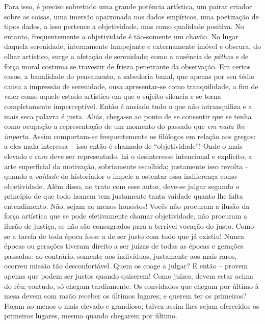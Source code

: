 Para isso, é preciso sobretudo uma grande potência artística, um pairar
criador sobre as coisas, uma imersão apaixonada nos dados empíricos, uma
poetização de tipos dados, a isso pertence a objetividade, mas como
qualidade positiva. No entanto, frequentemente a objetividade é
tão-somente um chavão. No lugar daquela serenidade, internamente
lampejante e externamente imóvel e obscura, do olhar artístico, surge a
afetação de serenidade; como a ausência de \emph{páthos} e de força
moral costuma se travestir de frieza penetrante da observação. Em certos
casos, a banalidade do pensamento, a sabedoria banal, que apenas por seu
tédio causa a impressão de serenidade, ousa apresentar-se como
tranquilidade, a fim de valer como aquele estado artístico em que o
sujeito silencia e se torna completamente imperceptível. Então é ansiado
tudo o que não intranquiliza e a mais seca palavra é justa. Aliás,
chega-se ao ponto de se consentir que se tenha como ocupação a
representação de um momento do passado que \emph{em nada lhe importa}.
Assim comportam-se frequentemente os filólogos em relação aos gregos: a
eles nada interessa -- isso então é chamado de ``objetividade''! Onde o
mais elevado e raro deve ser representado, há o desinteresse intencional
e explícito, a arte superficial da motivação, sobriamente escolhida;
justamente isso revolta -- quando a \emph{vaidade} do historiador o
impele a ostentar essa indiferença como objetividade. Além disso, no
trato com esse autor, deve-se julgar segundo o princípio de que todo
homem tem justamente tanta vaidade quanto lhe falta entendimento. Não,
sejam ao menos honestos! Vocês não procuram a ilusão da força artística
que se pode efetivamente chamar objetividade, não procuram a ilusão de
justiça, se não são consagrados para a terrível vocação do justo. Como
se a tarefa de toda época fosse a de ser justo com tudo que já existiu!
Nunca épocas ou gerações tiveram direito a ser juízas de todas as épocas
e gerações passadas: ao contrário, somente aos indivíduos, justamente
aos mais raros, ocorreu missão tão desconfortável. Quem os coage a
julgar? E então -- provem apenas que podem ser justos quando quiserem!
Como juízes, devem estar acima do réu; contudo, só chegam tardiamente.
Os convidados que chegam por último à mesa devem com razão receber os
últimos lugares; e querem ter os primeiros? Façam ao menos o mais
elevado e grandioso; talvez assim lhes sejam oferecidos os primeiros
lugares, mesmo quando chegarem por último.

